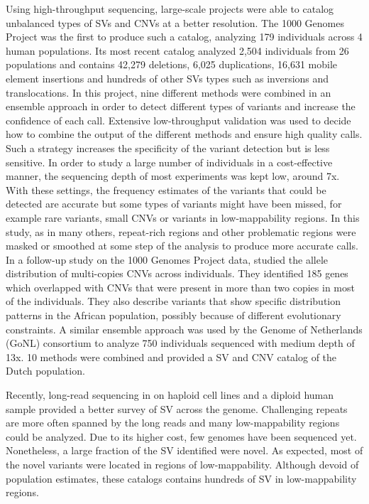 Using high-throughput sequencing, large-scale projects were able to catalog unbalanced types of SVs and CNVs at a better resolution.
The 1000 Genomes Project was the first to produce such a catalog, analyzing 179 individuals across 4 human populations\cite{Mills2011}.
Its most recent catalog\cite{Handsaker2015} analyzed 2,504 individuals from 26 populations and contains 42,279 deletions, 6,025 duplications, 16,631 mobile element insertions and hundreds of other SVs types such as inversions and translocations.
In this project, nine different methods were combined in an ensemble approach in order to detect different types of variants and increase the confidence of each call.
Extensive low-throughput validation was used to decide how to combine the output of the different methods and ensure high quality calls.
Such a strategy increases the specificity of the variant detection but is less sensitive.
In order to study a large number of individuals in a cost-effective manner, the sequencing depth of most experiments was kept low, around 7x.
With these settings, the frequency estimates of the variants that could be detected are accurate but some types of variants might have been missed, for example rare variants, small CNVs or variants in low-mappability regions.
In this study, as in many others, repeat-rich regions and other problematic regions were masked or smoothed at some step of the analysis to produce more accurate calls.
In a follow-up study on the 1000 Genomes Project data, \citet{Handsaker2015} studied the allele distribution of multi-copies CNVs across individuals.
They identified 185 genes which overlapped with CNVs that were present in more than two copies in most of the individuals.
They also describe variants that show specific distribution patterns in the African population, possibly because of different evolutionary constraints.
A similar ensemble approach was used by the Genome of Netherlands (GoNL) consortium to analyze 750 individuals sequenced with medium depth of 13x\cite{Francioli2014}.
10 methods were combined and provided a SV and CNV catalog of the Dutch population.

Recently, long-read sequencing in on haploid cell lines\cite{Chaisson2014} and a diploid human sample\cite{Pendleton2015} provided a better survey of SV across the genome.
Challenging repeats are more often spanned by the long reads and many low-mappability regions could be analyzed.
Due to its higher cost, few genomes have been sequenced yet.
Nonetheless, a large fraction of the SV identified were novel.
As expected, most of the novel variants were located in regions of low-mappability.
Although devoid of population estimates, these catalogs contains hundreds of SV in low-mappability regions.


